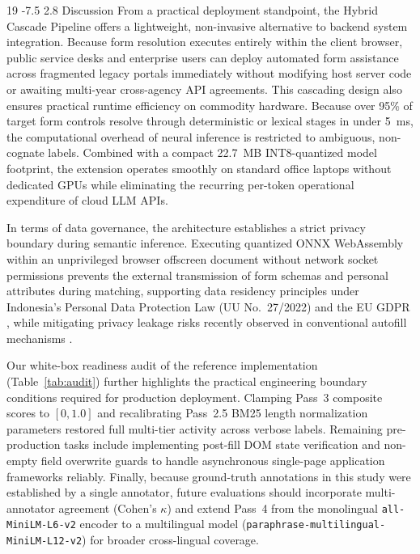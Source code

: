 \documentclass[runningheads,a4paper]{llncs}
\makeatletter
\renewcommand\section{\@startsection{section}{1}{\z@}%
  {-7.5\p@ \@plus -2\p@ \@minus -1\p@}%
  {2.8\p@ \@plus 1\p@}%
  {\normalfont\large\bfseries}}
\makeatother
\begin{document}
\begin{thebibliography}{19}
\section{Discussion}
\noindent From a practical deployment standpoint, the Hybrid Cascade Pipeline offers a lightweight, non-invasive alternative to backend system integration. Because form resolution executes entirely within the client browser, public service desks and enterprise users can deploy automated form assistance across fragmented legacy portals immediately without modifying host server code or awaiting multi-year cross-agency API agreements. This cascading design also ensures practical runtime efficiency on commodity hardware. Because over 95\% of target form controls resolve through deterministic or lexical stages in under 5~ms, the computational overhead of neural inference is restricted to ambiguous, non-cognate labels. Combined with a compact 22.7~MB INT8-quantized model footprint, the extension operates smoothly on standard office laptops without dedicated GPUs while eliminating the recurring per-token operational expenditure of cloud LLM APIs.

In terms of data governance, the architecture establishes a strict privacy boundary during semantic inference. Executing quantized ONNX WebAssembly within an unprivileged browser offscreen document without network socket permissions prevents the external transmission of form schemas and personal attributes during matching, supporting data residency principles under Indonesia's Personal Data Protection Law (UU No.~27/2022) \cite{pdp2022} and the EU GDPR \cite{gdpr2016}, while mitigating privacy leakage risks recently observed in conventional autofill mechanisms \cite{fu2024}.

Our white-box readiness audit of the reference implementation (Table~\ref{tab:audit}) further highlights the practical engineering boundary conditions required for production deployment. Clamping Pass~3 composite scores to $[0, 1.0]$ and recalibrating Pass~2.5 BM25 length normalization parameters restored full multi-tier activity across verbose labels. Remaining pre-production tasks include implementing post-fill DOM state verification and non-empty field overwrite guards to handle asynchronous single-page application frameworks reliably. Finally, because ground-truth annotations in this study were established by a single annotator, future evaluations should incorporate multi-annotator agreement (Cohen's $\kappa$) and extend Pass~4 from the monolingual \texttt{all-MiniLM-L6-v2} encoder to a multilingual model (\texttt{paraphrase-multilingual-MiniLM-L12-v2}) for broader cross-lingual coverage.


\end{thebibliography}
\end{document}
